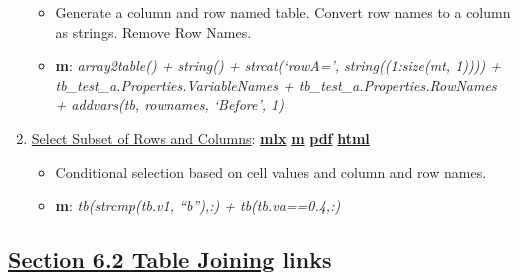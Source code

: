 \documentclass[
]{book}
\providecommand{\tightlist}{%
  \setlength{\itemsep}{0pt}\setlength{\parskip}{0pt}}
\begin{document}
\begin{enumerate}
  \begin{itemize}
  \tightlist
  \item
    Generate a column and row named table. Convert row names to a column as strings. Remove Row Names.
  \item
    \textbf{m}: \emph{array2table() + string() + strcat(`rowA=', string((1:size(mt, 1)))) + tb\_test\_a.Properties.VariableNames + tb\_test\_a.Properties.RowNames + addvars(tb, rownames, `Before', 1)}
  \end{itemize}
\item
  \href{https://fanwangecon.github.io/M4Econ/table/main/htmlpdfm/fs_tab_select_rows_cols.html}{Select Subset of Rows and Columns}: \href{https://github.com/FanWangEcon/M4Econ/blob/master/table/main/fs_tab_select_rows_cols.mlx}{\textbf{mlx}} \textbar{} \href{https://github.com/FanWangEcon/M4Econ/blob/master/table/main/htmlpdfm/fs_tab_select_rows_cols.m}{\textbf{m}} \textbar{} \href{https://github.com/FanWangEcon/M4Econ/blob/master/table/main/htmlpdfm/fs_tab_select_rows_cols.pdf}{\textbf{pdf}} \textbar{} \href{https://fanwangecon.github.io/M4Econ/table/main/htmlpdfm/fs_tab_select_rows_cols.html}{\textbf{html}}

  \begin{itemize}
  \tightlist
  \item
    Conditional selection based on cell values and column and row names.
  \item
    \textbf{m}: \emph{tb(strcmp(tb.v1, ``b''),:) + tb(tb.va==0.4,:)}
  \end{itemize}
\end{enumerate}

\hypertarget{section-6.2-table-joiningtable-joining-links}{%
\subsection{\texorpdfstring{\protect\hyperlink{table-joining}{Section 6.2 Table Joining} links}{Section 6.2 Table Joining links}}\label{section-6.2-table-joiningtable-joining-links}}
\end{document}
